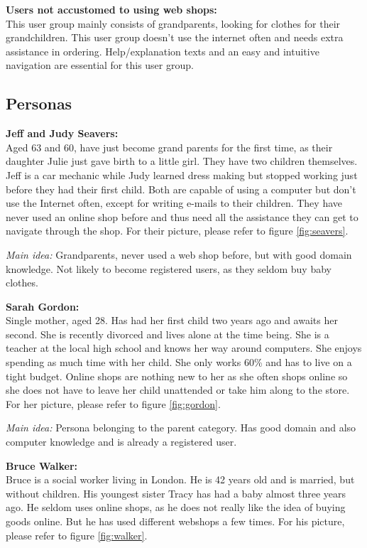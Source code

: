 \noindent\textbf{Users not accustomed to using web shops:}\\
This user group mainly consists of grandparents, looking for clothes for their grandchildren. This user group doesn't use the internet often and needs extra assistance in ordering. Help/explanation texts and an easy and intuitive navigation are essential for this user group. 

\subsection{Personas}
\noindent\textbf{Jeff and Judy Seavers:}\\
Aged 63 and 60, have just become grand parents for the first time, as their daughter Julie just gave birth to a little girl.
They have two children themselves. Jeff is a car mechanic while Judy learned dress making but stopped working just before they had their first child.
Both are capable of using a computer but don't use the Internet often, except for writing e-mails to their children.
They have never used an online shop before and thus need all the assistance they can get to navigate through the shop. For their picture, please refer to figure \ref{fig:seavers}.	

\textit{Main idea:}
Grandparents, never used a web shop before, but with good domain knowledge. Not likely to become registered users, as they seldom buy baby clothes.

\noindent\textbf{Sarah Gordon:}\\
Single mother, aged 28. Has had her first child two years ago and awaits her second. She is recently divorced and lives alone at the time being.
She is a teacher at the local high school and knows her way around computers. 
She enjoys spending as much time with her child. She only works 60\% and has to live on a tight budget.
Online shops are nothing new to her as she often shops online so she does not have to leave her child unattended or take him along to the store.
For her picture, please refer to figure \ref{fig:gordon}.	

\textit{Main idea:}
Persona belonging to the parent category. Has good domain and also computer knowledge and is already a registered user.

\noindent\textbf{Bruce Walker:}\\
Bruce is a social worker living in London. He is 42 years old and is married, but without children.
His youngest sister Tracy has had a baby almost three years ago.
He seldom uses online shops, as he does not really like the idea of buying goods online. But he has used different webshops a few times. For his picture, please refer to figure \ref{fig:walker}.	

